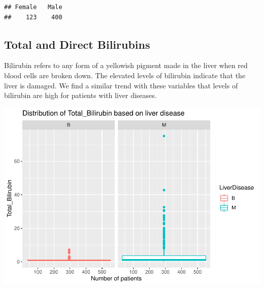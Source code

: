 \documentclass[]{article}
\newenvironment{Shaded}{\begin{snugshade}}{\end{snugshade}}
\newcommand{\CommentTok}[1]{\textcolor[rgb]{0.56,0.35,0.01}{\textit{#1}}}
\newcommand{\DataTypeTok}[1]{\textcolor[rgb]{0.13,0.29,0.53}{#1}}
\newcommand{\KeywordTok}[1]{\textcolor[rgb]{0.13,0.29,0.53}{\textbf{#1}}}
\newcommand{\NormalTok}[1]{#1}
\newcommand{\OperatorTok}[1]{\textcolor[rgb]{0.81,0.36,0.00}{\textbf{#1}}}
\newcommand{\StringTok}[1]{\textcolor[rgb]{0.31,0.60,0.02}{#1}}
\begin{document}
\begin{Shaded}
\end{Shaded}

\begin{verbatim}
## Female   Male 
##    123    400
\end{verbatim}

\subsection{Total and Direct Bilirubins}

Bilirubin refers to any form of a yellowish pigment made in the liver
when red blood cells are broken down. The elevated levels of bilirubin
indicate that the liver is damaged. We find a similar trend with these
variables that levels of bilirubin are high for patients with liver
diseases.

\begin{Shaded}
\end{Shaded}

\includegraphics{LiverDisease_files/figure-latex/unnamed-chunk-14-1.pdf}
\end{document}
